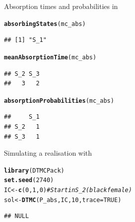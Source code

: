\documentclass[aspectratio=169]{beamer}\usepackage[]{graphicx}\usepackage[]{xcolor}
\makeatletter
\newcommand{\hlnum}[1]{\textcolor[rgb]{0.686,0.059,0.569}{#1}}%
\newcommand{\hlcom}[1]{\textcolor[rgb]{0.678,0.584,0.686}{\textit{#1}}}%
\newcommand{\hldef}[1]{\textcolor[rgb]{0.345,0.345,0.345}{#1}}%
\newcommand{\hlkwb}[1]{\textcolor[rgb]{0.69,0.353,0.396}{#1}}%
\newcommand{\hlkwc}[1]{\textcolor[rgb]{0.333,0.667,0.333}{#1}}%
\newcommand{\hlkwd}[1]{\textcolor[rgb]{0.737,0.353,0.396}{\textbf{#1}}}%
\newenvironment{kframe}{%
 \def\at@end@of@kframe{}%
 \ifinner\ifhmode%
  \def\at@end@of@kframe{\end{minipage}}%
  \begin{minipage}{\columnwidth}%
 \fi\fi%
 \def\FrameCommand##1{\hskip\@totalleftmargin \hskip-\fboxsep
 \colorbox{shadecolor}{##1}\hskip-\fboxsep
     \hskip-\linewidth \hskip-\@totalleftmargin \hskip\columnwidth}%
 \MakeFramed {\advance\hsize-\width
   \@totalleftmargin\z@ \linewidth\hsize
   \@setminipage}}%
 {\par\unskip\endMakeFramed%
 \at@end@of@kframe}
\newenvironment{knitrout}{}{} %
\makeatother
\begin{document}
\begin{frame}[fragile]{Absorption times and probabilities in }
\begin{knitrout}
\color{fgcolor}\begin{kframe}
\begin{alltt}
\hlkwd{absorbingStates}\hldef{(mc_abs)}
\end{alltt}
\begin{verbatim}
## [1] "S_1"
\end{verbatim}
\begin{alltt}
\hlkwd{meanAbsorptionTime}\hldef{(mc_abs)}
\end{alltt}
\begin{verbatim}
## S_2 S_3 
##   3   2
\end{verbatim}
\begin{alltt}
\hlkwd{absorptionProbabilities}\hldef{(mc_abs)}
\end{alltt}
\begin{verbatim}
##     S_1
## S_2   1
## S_3   1
\end{verbatim}
\end{kframe}
\end{knitrout}
\end{frame}

\begin{frame}[fragile]{Simulating a realisation with }
\begin{knitrout}
\color{fgcolor}\begin{kframe}
\begin{alltt}
\hlkwd{library}\hldef{(DTMCPack)}
\hlkwd{set.seed}\hldef{(}\hlnum{2740}\hldef{)}
\hldef{IC} \hlkwb{<-} \hlkwd{c}\hldef{(}\hlnum{0}\hldef{,} \hlnum{1}\hldef{,} \hlnum{0}\hldef{)} \hlcom{# Start in S_2 (black female)}
\hldef{sol} \hlkwb{<-} \hlkwd{DTMC}\hldef{(P_abs, IC,} \hlnum{10}\hldef{,} \hlkwc{trace} \hldef{=} \hlnum{TRUE}\hldef{)}
\end{alltt}
\begin{verbatim}
## NULL
\end{verbatim}
\end{kframe}
\end{knitrout}
\end{frame}

\end{document}
